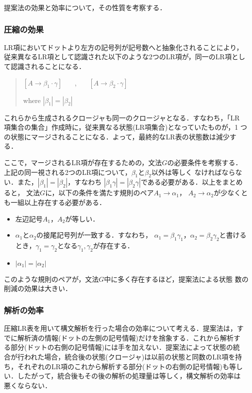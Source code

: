 提案法の効果と効率について，その性質を考察する．

\subsubsection{圧縮の効果}

LR項においてドットより左方の記号列が記号数へと抽象化されることにより，
従来異なるLR項として認識された以下のような2つのLR項が，同一のLR項とし
て認識されることになる．
\begin{quote}
  $[ A \rightarrow \beta_1 \cdot \gamma]$ ~~~,~~~
  $[ A \rightarrow \beta_2 \cdot \gamma]$

  where $|\beta_1| = |\beta_2|$
\end{quote}
これらから生成されるクロージャも同一のクロージャとなる．すなわち，「LR
項集合の集合」作成時に，従来異なる状態(LR項集合)となっていたものが，1
つの状態にマージされることになる．よって，最終的なLR表の状態数は減少す
る．

ここで，マージされるLR項が存在するための，文法$G$の必要条件を考察する．
上記の同一視される2つのLR項について，$\beta_1$と$\beta_2$以外は等しく
なければならない．また，$|\beta_1|= |\beta_2|$，すなわち
$|\beta_1\gamma| = |\beta_2\gamma|$である必要がある．以上をまとめると，
文法$G$に，以下の条件を満たす規則のペア$A_1 \rightarrow \alpha_1$，
$A_2 \rightarrow \alpha_2$が少なくとも一組以上存在する必要がある．
\begin{itemize}
\item 左辺記号$A_1$，$A_2$が等しい．

\item $\alpha_1$と$\alpha_2$の接尾記号列が一致する．すなわち，
  $\alpha_1 = \beta_1 \gamma_1$，$\alpha_2 = \beta_2 \gamma_2$と書ける
  とき，$\gamma_1 = \gamma_2$となる$\gamma_1,\gamma_2$が存在する．

\item $|\alpha_1| = |\alpha_2|$
\end{itemize}
このような規則のペアが，文法$G$中に多く存在するほど，提案法による状態
数の削減の効果は大きい．

\subsubsection{解析の効率}

圧縮LR表を用いて構文解析を行った場合の効率について考える．提案法は，す
でに解析済の情報(ドットの左側の記号情報)だけを捨象する．これから解析す
る部分(ドットの右側の記号情報)には手を加えない．提案法によって状態の統
合が行われた場合，統合後の状態(クロージャ)は以前の状態と同数のLR項を持
ち，それぞれのLR項のこれから解析する部分(ドットの右側の記号情報)も等し
い．したがって，統合後もその後の解析の処理量は等しく，構文解析の効率は
悪くならない．


